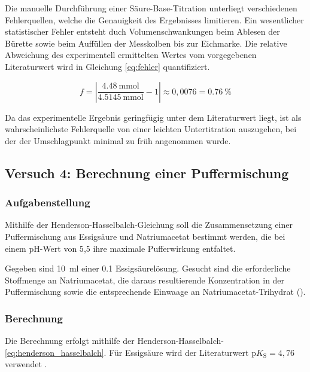 Die manuelle Durchführung einer Säure-Base-Titration unterliegt verschiedenen Fehlerquellen, welche die Genauigkeit des Ergebnisses limitieren. Ein wesentlicher statistischer Fehler entsteht duch Volumenschwankungen beim Ablesen der Bürette sowie beim Auffüllen der Messkolben bis zur Eichmarke. Die relative Abweichung des experimentell ermittelten Wertes vom vorgegebenen Literaturwert wird in Gleichung \eqref{eq:fehler} quantifiziert.

\begin{equation}
    f = \left| \frac{\SI{4,48}{\milli\mole}}{\SI{4,5145}{\milli\mole}} - 1 \right| \approx 0,0076 = \SI{0,76}{\percent}
    \label{eq:fehler}
\end{equation}

Da das experimentelle Ergebnis geringfügig unter dem Literaturwert liegt, ist als wahrscheinlichste Fehlerquelle von einer leichten Untertitration auszugehen, bei der der Umschlagpunkt minimal zu früh angenommen wurde. \cite{demtroder_experimentalphysik_2021}

\subsection{Versuch 4: Berechnung einer Puffermischung}

\subsubsection{Aufgabenstellung}

Mithilfe der Henderson-Hasselbalch-Gleichung soll die Zusammensetzung einer Puffermischung aus Essigsäure und Natriumacetat bestimmt werden, die bei einem pH-Wert von 5{,}5 ihre maximale Pufferwirkung entfaltet.

Gegeben sind \SI{10}{ml} einer \SI{0,1}{} Essigsäurelösung. Gesucht sind die erforderliche Stoffmenge an Natriumacetat, die daraus resultierende Konzentration in der Puffermischung sowie die entsprechende Einwaage an Natriumacetat-Trihydrat ().

\subsubsection{Berechnung}

Die Berechnung erfolgt mithilfe der Henderson-Hasselbalch-\eqref{eq:henderson_hasselbalch}. Für Essigsäure wird der Literaturwert \(\mathrm{p}K_\mathrm{S} = 4{,}76\) verwendet \cite{pKs_Chemie}.

